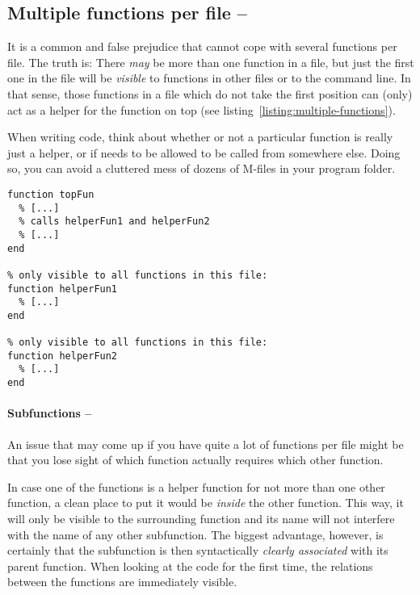 \subsection{Multiple functions per file  -- \cleansymbol\cleansymbol\cleansymbol}
It is a common and false prejudice that \matlab{} cannot cope with several
functions per file. The truth is: There \emph{may} be more than one function
in a file, but just the first one in the file will be \emph{visible} to
functions in other files or to the command line. In that sense, those
functions in a file which do not take the first position can (only) act as a
helper for the function on top (see listing~\ref{listing:multiple-functions}).

When writing code, think about whether or not a particular function is really
just a helper, or if needs to be allowed to be called from somewhere else.
Doing so, you can avoid a cluttered mess of dozens of M-files in your program
folder.

\begin{lstlisting}[framerule=2pt,rulecolor=\color{goodgreen},float,label={listing:multiple-functions},caption={One source containing three functions: Useful when \lstinline!helperFun1! and \lstinline!helperFun2! are only needed by \lstinline!topFun!.}]
% callable from outside:
function topFun
  % [...]
  % calls helperFun1 and helperFun2
  % [...]
end

% only visible to all functions in this file:
function helperFun1
  % [...]
end

% only visible to all functions in this file:
function helperFun2
  % [...]
end
\end{lstlisting}


\paragraph{Subfunctions -- \cleansymbol\cleansymbol}
An issue that may come up if you have quite a lot of functions per file might
be that you lose sight of which function actually requires which other
function.

In case one of the functions is a helper function for not more than one other
function, a clean place to put it would be \emph{inside} the other function.
This way, it will only be visible to the surrounding function and its name
will not interfere with the name of any other subfunction. The biggest
advantage, however, is certainly that the subfunction is then syntactically
\emph{clearly associated} with its parent function. When looking at the code
for the first time, the relations between the functions are immediately
visible.


